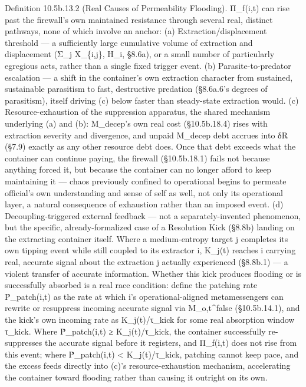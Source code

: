 \documentclass[
]{article}
\begin{document}
Definition 10.5b.13.2 (Real Causes of Permeability Flooding). Π\_f(i,t)
can rise past the firewall's own maintained resistance through several
real, distinct pathways, none of which involve an anchor: (a)
Extraction/displacement threshold --- a sufficiently large cumulative
volume of extraction and displacement (Σ\_j X\_\{i,j\}, H\_i, §8.6a), or
a small number of particularly egregious acts, rather than a single
fixed trigger event. (b) Parasite-to-predator escalation --- a shift in
the container's own extraction character from sustained, sustainable
parasitism to fast, destructive predation (§8.6a.6's degrees of
parasitism), itself driving (c) below faster than steady-state
extraction would. (c) Resource-exhaustion of the suppression apparatus,
the shared mechanism underlying (a) and (b): M\_decep's own real cost
(§10.5b.18.4) rises with extraction severity and divergence, and unpaid
M\_decep debt accrues into δR (§7.9) exactly as any other resource debt
does. Once that debt exceeds what the container can continue paying, the
firewall (§10.5b.18.1) fails not because anything forced it, but because
the container can no longer afford to keep maintaining it --- chaos
previously confined to operational begins to permeate official's own
understanding and sense of self as well, not only its operational layer,
a natural consequence of exhaustion rather than an imposed event. (d)
Decoupling-triggered external feedback --- not a separately-invented
phenomenon, but the specific, already-formalized case of a Resolution
Kick (§8.8b) landing on the extracting container itself. Where a
medium-entropy target j completes its own tipping event while still
coupled to its extractor i, K\_j(t) reaches i carrying real, accurate
signal about the extraction j actually experienced (§8.8b.1) --- a
violent transfer of accurate information. Whether this kick produces
flooding or is successfully absorbed is a real race condition: define
the patching rate Ṗ\_patch(i,t) as the rate at which i's
operational-aligned metamessengers can rewrite or resuppress incoming
accurate signal via M\_o,t\^{}false (§10.5b.14.1), and the kick's own
incoming rate as K\_j(t)/τ\_kick for some real absorption window
τ\_kick. Where Ṗ\_patch(i,t) ≥ K\_j(t)/τ\_kick, the container
successfully re-suppresses the accurate signal before it registers, and
Π\_f(i,t) does not rise from this event; where Ṗ\_patch(i,t) \textless{}
K\_j(t)/τ\_kick, patching cannot keep pace, and the excess feeds
directly into (c)'s resource-exhaustion mechanism, accelerating the
container toward flooding rather than causing it outright on its own.
\end{document}
